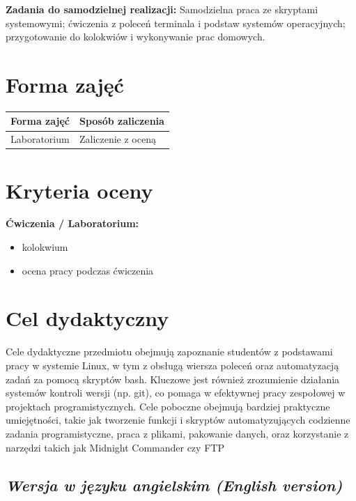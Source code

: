 \documentclass[12pt, a4paper]{article}
\newcommand{\thdrule}{\noalign{\global\setlength{\extrarowheight}{0pt}}}
\newcommand{\thdend}{\noalign{\global\setlength{\extrarowheight}{3pt}}}
\begin{document}
\vspace{4pt}
\noindent\textbf{Zadania do samodzielnej realizacji:} Samodzielna praca ze skryptami systemowymi; ćwiczenia z poleceń terminala i podstaw systemów operacyjnych; przygotowanie do kolokwiów i wykonywanie prac domowych.

\section{Forma zajęć}

\begin{center}
{\scriptsize
\begin{tabular}{m{5cm}m{8cm}}
\thdrule\toprule
\rowcolor{pjatkRed} {\color{white}\textbf{Forma zajęć}} & {\color{white}\textbf{Sposób zaliczenia}} \\
\midrule\thdend
  \rowcolor{tableRowLight} Laboratorium & Zaliczenie z oceną \\
\bottomrule
\end{tabular}}
\end{center}

\section{Kryteria oceny}

\textbf{Ćwiczenia / Laboratorium:}
\begin{itemize}
  \item kolokwium
  \item ocena pracy podczas ćwiczenia
\end{itemize}


\section{Cel dydaktyczny}

Cele dydaktyczne przedmiotu obejmują zapoznanie studentów z podstawami pracy w systemie Linux, w tym z obsługą wiersza poleceń oraz automatyzacją zadań za pomocą skryptów bash. Kluczowe jest również zrozumienie działania systemów kontroli wersji (np. git), co pomaga w efektywnej pracy zespołowej w projektach programistycznych. Cele poboczne obejmują bardziej praktyczne umiejętności, takie jak tworzenie funkcji i skryptów automatyzujących codzienne zadania programistyczne, praca z plikami, pakowanie danych, oraz korzystanie z narzędzi takich jak Midnight Commander czy FTP

\subsection*{\textit{Wersja w języku angielskim (English version)}}
\end{document}
